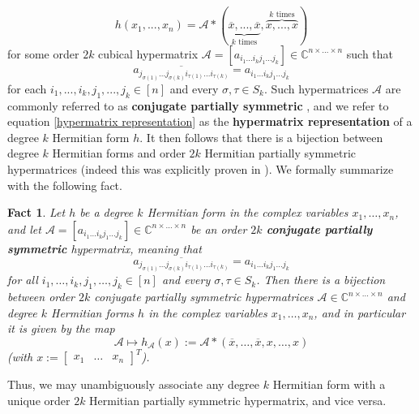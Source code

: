 \documentclass[11pt]{article}
\newtheorem{fact}[theorem]{Fact}
\begin{document}
\begin{equation}\label{hypermatrix representation}
    h(x_1,...,x_n) = \mathcal{A}*(\underbrace{\overline{x},...,\overline{x}}_{k\text{ times}},\overbrace{x,...,x}^{k\text{ times}})
\end{equation}
for some order $2k$ cubical hypermatrix $\mathcal{A} = [a_{i_1...i_kj_1...j_k}]\in \mathbb{C}^{n\times...\times n}$ such that 
\[\overline{a_{j_{\sigma(1)}...j_{\sigma(k)}i_{\tau(1)}...i_{\tau(k)}}} = a_{i_1\dots i_k j_1\dots j_k}\] for each $i_1,...,i_k,j_1,...,j_k\in [n]$ and every $\sigma,\tau\in S_k$. Such hypermatrices $\mathcal{A}$ are commonly referred to as \textbf{conjugate partially symmetric} \cite{jiang2016characterizing}, and we refer to equation \eqref{hypermatrix representation} as the \textbf{hypermatrix representation} of a degree $k$ Hermitian form $h$. It then follows that there is a bijection between degree $k$ Hermitian forms and order $2k$ Hermitian partially symmetric hypermatrices (indeed this was explicitly proven in \cite{jiang2016characterizing}). We formally summarize with the following fact.
\begin{fact}\label{Hermitian Form Bijection}\cite[Proposition 3.8]{jiang2016characterizing}
    Let $h$ be a degree $k$ Hermitian form in the complex variables $x_1,\dots,x_n$, and let $\mathcal{A} = [a_{i_1\dots i_k j_1\dots j_k}]\in \mathbb{C}^{n\times\dots\times n}$ be an order $2k$ \textbf{conjugate partially symmetric} hypermatrix, meaning that 
    \[\overline{a_{j_{\sigma(1)}\dots j_{\sigma(k)}i_{\tau(1)}\dots i_{\tau(k)}}} = a_{i_1\dots i_k j_1\dots j_k}\]
    for all $i_1,\dots,i_k,j_1,\dots,j_k\in [n]$ and every $\sigma,\tau\in S_k$. Then there is a bijection between order $2k$ conjugate partially symmetric hypermatrices $\mathcal{A}\in \mathbb{C}^{n\times\dots\times n}$ and degree $k$ Hermitian forms $h$ in the complex variables $x_1,\dots,x_n$, and in particular it is given by the map 
    \[\mathcal{A}\mapsto h_{\mathcal{A}}(x) := \mathcal{A}*(\overline{x},\dots,\overline{x},x,\dots,x)\]
    (with $x := \left[\begin{array}{ccc}
        x_1 & \dots & x_n
    \end{array}\right]^T$). 
\end{fact}
Thus, we may unambiguously associate any degree $k$ Hermitian form with a unique order $2k$ Hermitian partially symmetric hypermatrix, and vice versa. 
\end{document}
